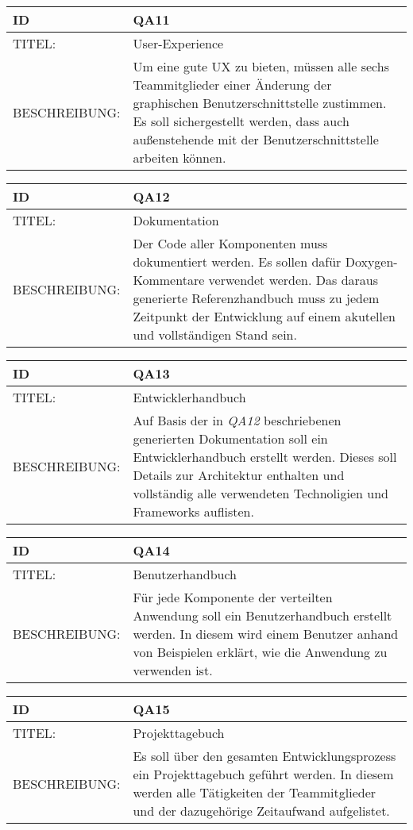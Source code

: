 \begin{tabularx}{16cm}{l|X}
	 \textbf{ID} & \textbf{QA11} \\
	 \hline
		TITEL: & User-Experience\\ 
	 \hline 
	 BESCHREIBUNG: & Um eine gute UX zu bieten, müssen alle sechs Teammitglieder einer Änderung der graphischen Benutzerschnittstelle zustimmen. Es soll sichergestellt werden, dass auch außenstehende mit der Benutzerschnittstelle arbeiten können. 
\end{tabularx} 


\begin{tabularx}{16cm}{l|X}
	 \textbf{ID} & \textbf{QA12} \\
	 \hline
		TITEL: & Dokumentation\\ 
	 \hline 
	 BESCHREIBUNG: & Der Code aller Komponenten muss dokumentiert werden. Es sollen dafür Doxygen-Kommentare verwendet werden. Das daraus generierte Referenzhandbuch muss zu jedem Zeitpunkt der Entwicklung auf einem akutellen und vollständigen Stand sein.  
\end{tabularx} 


\begin{tabularx}{16cm}{l|X}
	 \textbf{ID} & \textbf{QA13} \\
	 \hline
		TITEL: & Entwicklerhandbuch\\ 
	 \hline 
		BESCHREIBUNG: & Auf Basis der in \textit{QA12} beschriebenen generierten Dokumentation soll ein Entwicklerhandbuch erstellt werden. Dieses soll Details zur Architektur enthalten und vollständig alle verwendeten Technoligien und Frameworks auflisten.
\end{tabularx} 


\begin{tabularx}{16cm}{l|X}
	 \textbf{ID} & \textbf{QA14} \\
	 \hline
		TITEL: & Benutzerhandbuch\\ 
	 \hline 
	 BESCHREIBUNG: & Für jede Komponente der verteilten Anwendung soll ein Benutzerhandbuch erstellt werden. In diesem wird einem Benutzer anhand von Beispielen erklärt, wie die Anwendung zu verwenden ist. 
\end{tabularx} 


\begin{tabularx}{16cm}{l|X}
	 \textbf{ID} & \textbf{QA15} \\
	 \hline
		TITEL: & Projekttagebuch\\ 
	 \hline 
	 BESCHREIBUNG: & Es soll über den gesamten Entwicklungsprozess ein Projekttagebuch geführt werden. In diesem werden alle Tätigkeiten der Teammitglieder und der dazugehörige Zeitaufwand aufgelistet. 
\end{tabularx} 
